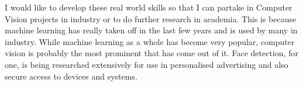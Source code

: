 I would like to develop these real world skills so that I can partake in
Computer Vision projects in industry or to do further research in academia. This
is because machine learning has really taken off in the last few years and is
used by many in industry. While machine learning as a whole has become very
popular, computer vision is probably the most prominent that has come out of it.
Face detection, for one, is being researched extensively for use in personalised
advertising and also secure access to devices and systems.

